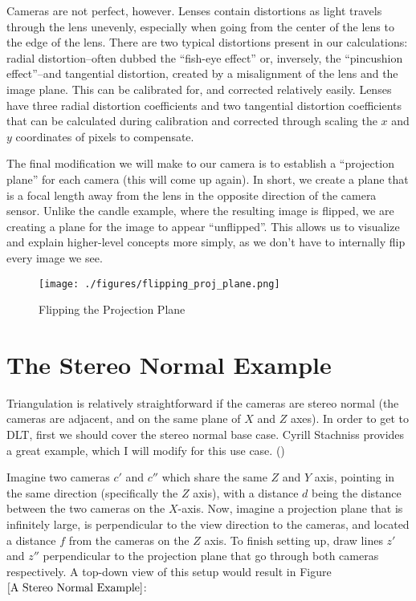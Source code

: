 \documentclass[
    12pt,
    twoside,
    bibstyle=chicago,
    headerstyle=uppercase,
	bibfile=thesis.bib
]{reedthesis}
\begin{document}
Cameras are not perfect, however. Lenses contain distortions as light travels through the lens unevenly, especially when going from the center of the lens to the edge of the lens. There are two typical distortions present in our calculations: radial distortion--often dubbed the “fish-eye effect” or, inversely, the “pincushion effect”--and tangential distortion, created by a misalignment of the lens and the image plane. This can be calibrated for, and corrected relatively easily. Lenses have three radial distortion coefficients and two tangential distortion coefficients that can be calculated during calibration and corrected through scaling the $x$ and $y$ coordinates of pixels to compensate.


The final modification we will make to our camera is to establish a “projection plane” for each camera (this will come up again). In short, we create a plane that is a focal length away from the lens in the opposite direction of the camera sensor. Unlike the candle example, where the resulting image is flipped, we are creating a plane for the image to appear “unflipped”. This allows us to visualize and explain higher-level concepts more simply, as we don't have to internally flip every image we see.

\begin{figure}[h]
	    \centering
	    \texttt{[image: ./figures/flipping\_proj\_plane.png]}
		
	    \caption{Flipping the Projection Plane}
	 \label{Flipping the Projection Plane}
	\end{figure}

\section{The Stereo Normal Example}

Triangulation is relatively straightforward if the cameras are stereo normal (the cameras are adjacent, and on the same plane of $X$ and $Z$ axes). In order to get to DLT, first we should cover the stereo normal base case. Cyrill Stachniss provides a great example, which I will modify for this use case. (\autocite{stachniss_lecture_2021})

	Imagine two cameras $c'$ and $c''$ which share the same $Z$ and $Y$ axis, pointing in the same direction (specifically the $Z$ axis), with a distance $d$ being the distance between the two cameras on the $X$-axis. Now, imagine a projection plane that is infinitely large, is perpendicular to the view direction to the cameras, and located a distance $f$ from the cameras on the $Z$ axis. To finish setting up, draw lines $z'$ and $z''$ perpendicular to the projection plane that go through both cameras respectively. A top-down view of this setup would result in Figure $\ref{A Stereo Normal Example}$: 
	
\end{document}
